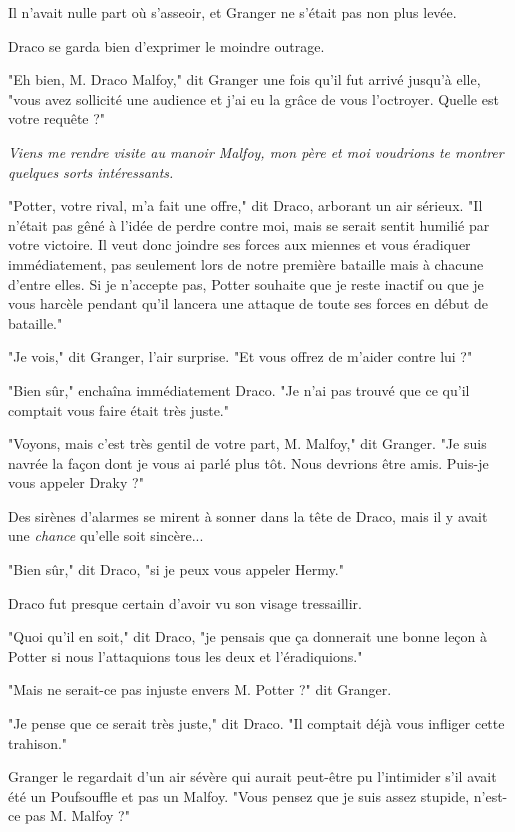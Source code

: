 Il n'avait nulle part où s'asseoir, et Granger ne s'était pas non plus levée.

Draco se garda bien d'exprimer le moindre outrage.

"Eh bien, M. Draco Malfoy," dit Granger une fois qu'il fut arrivé jusqu'à elle, "vous avez sollicité une audience et j'ai eu la grâce de vous l'octroyer. Quelle est votre requête ?"

\emph{Viens me rendre visite au manoir Malfoy, mon père et moi voudrions te montrer quelques sorts intéressants.} 

"Potter, votre rival, m'a fait une offre," dit Draco, arborant un air sérieux. "Il n'était pas gêné à l'idée de perdre contre moi, mais se serait sentit humilié par votre victoire. Il veut donc joindre ses forces aux miennes et vous éradiquer immédiatement, pas seulement lors de notre première bataille mais à chacune d'entre elles. Si je n'accepte pas, Potter souhaite que je reste inactif ou que je vous harcèle pendant qu'il lancera une attaque de toute ses forces en début de bataille."

"Je vois," dit Granger, l'air surprise. "Et vous offrez de m'aider contre lui ?"

"Bien sûr," enchaîna immédiatement Draco. "Je n'ai pas trouvé que ce qu'il comptait vous faire était très juste."

"Voyons, mais c'est très gentil de votre part, M. Malfoy," dit Granger. "Je suis navrée la façon dont je vous ai parlé plus tôt. Nous devrions être amis. Puis-je vous appeler Draky ?"

Des sirènes d'alarmes se mirent à sonner dans la tête de Draco, mais il y avait une \emph{chance}  qu'elle soit sincère...

"Bien sûr," dit Draco, "si je peux vous appeler Hermy."

Draco fut presque certain d'avoir vu son visage tressaillir.

"Quoi qu'il en soit," dit Draco, "je pensais que ça donnerait une bonne leçon à Potter si nous l'attaquions tous les deux et l'éradiquions."

"Mais ne serait-ce pas injuste envers M. Potter ?" dit Granger.

"Je pense que ce serait très juste," dit Draco. "Il comptait déjà vous infliger cette trahison."

Granger le regardait d'un air sévère qui aurait peut-être pu l'intimider s'il avait été un Poufsouffle et pas un Malfoy. "Vous pensez que je suis assez stupide, n'est-ce pas M. Malfoy ?"

